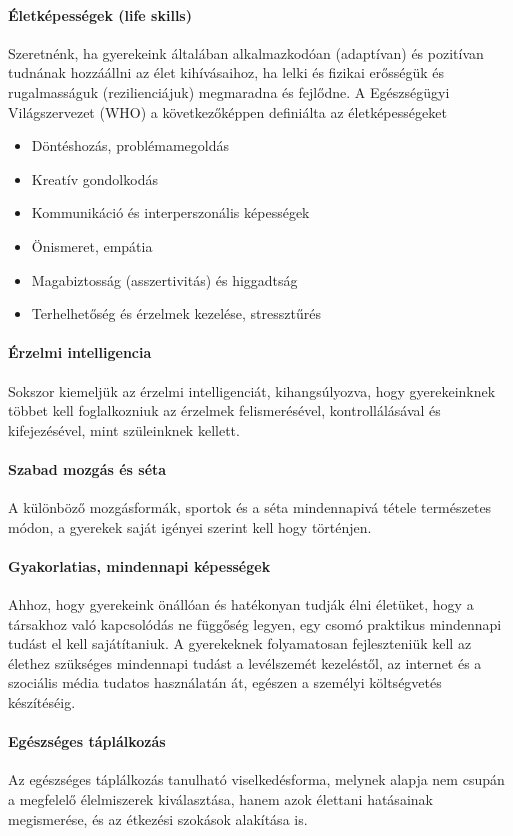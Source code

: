 \paragraph{Életképességek (life skills)}

Szeretnénk, ha gyerekeink általában alkalmazkodóan (adaptívan) és pozitívan
tudnának hozzáállni az élet kihívásaihoz, ha lelki és fizikai erősségük és
rugalmasságuk (rezilienciájuk) megmaradna és fejlődne.	 A Egészségügyi
Világszervezet (WHO) a következőképpen definiálta \citep{oecd99lifeskills} az
életképességeket
\begin{itemize}
  \item Döntéshozás, problémamegoldás

  \item Kreatív gondolkodás

  \item Kommunikáció és interperszonális képességek

  \item Önismeret, empátia

  \item Magabiztosság (asszertivitás) és higgadtság

  \item Terhelhetőség és érzelmek kezelése, stressztűrés
\end{itemize}
\paragraph{Érzelmi intelligencia}

Sokszor kiemeljük az érzelmi intelligenciát, kihangsúlyozva, hogy gyerekeinknek
többet kell foglalkozniuk az érzelmek felismerésével, kontrollálásával és
kifejezésével, mint szüleinknek kellett.

\paragraph{Szabad mozgás és séta}

A különböző mozgásformák, sportok és a séta mindennapivá tétele természetes
módon, a gyerekek saját igényei szerint kell hogy történjen.

\paragraph{Gyakorlatias, mindennapi képességek}

Ahhoz, hogy gyerekeink önállóan és hatékonyan tudják élni életüket, hogy a
társakhoz való kapcsolódás ne függőség legyen, egy csomó praktikus mindennapi
tudást el kell sajátítaniuk. A gyerekeknek folyamatosan fejleszteniük kell az
élethez szükséges mindennapi tudást a levélszemét kezeléstől, az internet és a szociális média
tudatos használatán át, egészen a személyi költségvetés készítéséig.

\paragraph{Egészséges táplálkozás}

Az egészséges táplálkozás tanulható viselkedésforma, melynek alapja nem csupán
a megfelelő élelmiszerek kiválasztása, hanem azok élettani hatásainak
megismerése, és az étkezési szokások alakítása is.


